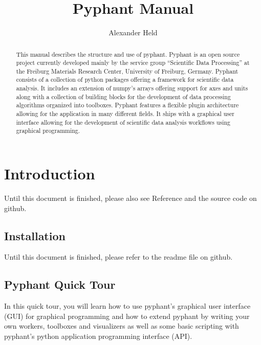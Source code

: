 \documentclass[a4paper]{article}
\begin{document}
\title{Pyphant Manual}
\author{Alexander Held}

\maketitle

\date{}

\begin{abstract}
  This manual describes the structure and use of
  pyphant. Pyphant is an open source project
  currently developed mainly by the service group ``Scientific Data
  Processing'' at the Freiburg Materials Research Center, University
  of Freiburg, Germany. Pyphant consists of a collection of python
  packages offering a framework for scientific data analysis. It
  includes an extension of numpy's arrays offering
  support for axes and units along with a collection of building
  blocks for the development of data processing algorithms organized
  into toolboxes. Pyphant features a flexible plugin architecture
  allowing for the application in many different fields. It ships with
  a graphical user interface allowing for the development of
  scientific data analysis workflows using graphical programming.
\end{abstract}

\tableofcontents

\section{Introduction}
\label{sec:introduction}

Until this document is finished, please also see
Reference\cite{pyphant} and the source code on
github\cite{pyphanturl}.

\subsection{Installation}
\label{sec:introduction_installation}

Until this document is finished, please refer to the readme file on
github\cite{pyphanturl}.

\subsection{Pyphant Quick Tour}
\label{sec:introduction_a_quick_tour}

In this quick tour, you will learn how to use pyphant's graphical user
interface (GUI) for graphical programming and how to extend pyphant by
writing your own workers, toolboxes and visualizers as well as some
basic scripting with pyphant's python application programming
interface (API).
\end{document}

